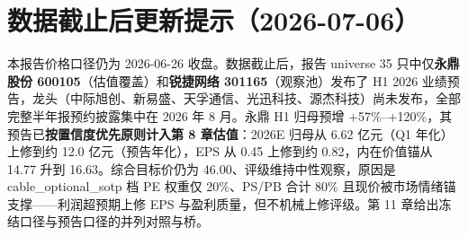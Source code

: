 \section{数据截止后更新提示（2026-07-06）}
本报告价格口径仍为 2026-06-26 收盘。数据截止后，报告 universe 35 只中仅\textbf{永鼎股份 600105}（估值覆盖）和\textbf{锐捷网络 301165}（观察池）发布了 H1 2026 业绩预告，龙头（中际旭创、新易盛、天孚通信、光迅科技、源杰科技）尚未发布，全部完整半年报预约披露集中在 2026 年 8 月。永鼎 H1 归母预增 +57\%--+120\%，其预告已\textbf{按置信度优先原则计入第 8 章估值}：2026E 归母从 6.62 亿元（Q1 年化）上修到约 12.0 亿元（预告年化），EPS 从 0.45 上修到约 0.82，内在价值锚从 14.77 升到 16.63。综合目标价仍为 46.00、评级维持中性观察，原因是 cable\_optional\_sotp 档 PE 权重仅 20\%、PS/PB 合计 80\% 且现价被市场情绪锚支撑——利润超预期上修 EPS 与盈利质量，但不机械上修评级。第 11 章给出冻结口径与预告口径的并列对照与桥。
